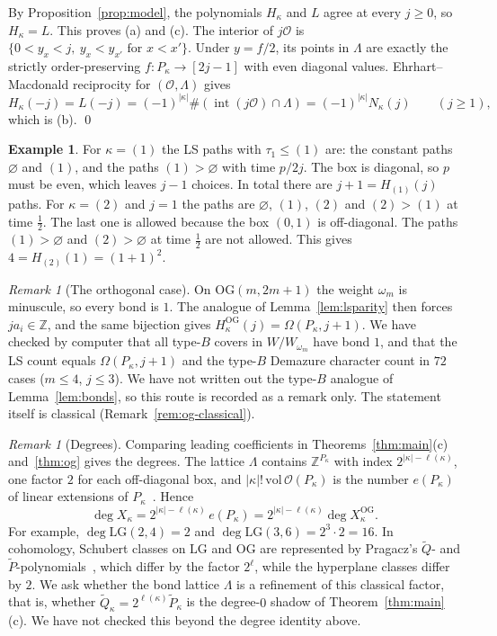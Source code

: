\documentclass[11pt]{amsart}
\theoremstyle{definition}
\newtheorem{example}[theorem]{Example}
\theoremstyle{remark}
\newtheorem{remark}[theorem]{Remark}
\newcommand{\LG}{\mathrm{LG}}
\newcommand{\OG}{\mathrm{OG}}
\newcommand{\Z}{\mathbb{Z}}
\newcommand{\Om}{\Omega}
\newcommand{\HOG}{H^{\OG}}
\newcommand{\ord}{\mathcal{O}}
\newcommand{\interior}{\operatorname{int}}
\begin{document}
By Proposition~\ref{prop:model}, the polynomials $H_\kappa$ and $L$ agree at every $j\ge0$, so
$H_\kappa=L$. This proves (a) and (c). The interior of $j\ord$ is
$\{0<y_x<j,\ y_x<y_{x'}\text{ for }x<x'\}$. Under $y=f/2$, its points in $\Lambda$ are exactly
the strictly order-preserving $f\colon P_\kappa\to[2j-1]$ with even diagonal values.
Ehrhart--Macdonald reciprocity for $(\ord,\Lambda)$ gives
\[ H_\kappa(-j)=L(-j)=(-1)^{|\kappa|}\#(\interior(j\ord)\cap\Lambda)=(-1)^{|\kappa|}N_\kappa(j)\qquad(j\ge1), \]
which is (b). \qed

\begin{example}\label{ex:ls-small}
For $\kappa=(1)$ the LS paths with $\tau_1\le(1)$ are: the constant paths $\varnothing$ and
$(1)$, and the paths $(1)>\varnothing$ with time $p/2j$. The box is diagonal, so $p$ must be
even, which leaves $j-1$ choices. In total there are $j+1=H_{(1)}(j)$ paths. For $\kappa=(2)$
and $j=1$ the paths are $\varnothing$, $(1)$, $(2)$ and $(2)>(1)$ at time $\tfrac12$. The last
one is allowed because the box $(0,1)$ is off-diagonal. The paths $(1)>\varnothing$ and
$(2)>\varnothing$ at time $\tfrac12$ are not allowed. This gives $4=H_{(2)}(1)=(1+1)^2$.
\end{example}

\begin{remark}[The orthogonal case]\label{rem:og-ls}
On $\OG(m,2m+1)$ the weight $\omega_m$ is minuscule, so every bond is $1$. The analogue of
Lemma~\ref{lem:lsparity} then forces $ja_i\in\Z$, and the same bijection gives
$\HOG_\kappa(j)=\Om(P_\kappa,j+1)$. We have checked by computer that all type-$B$ covers in
$W/W_{\omega_m}$ have bond $1$, and that the LS count equals $\Om(P_\kappa,j+1)$ and the
type-$B$ Demazure character count in $72$ cases ($m\le4$, $j\le3$). We have not written out
the type-$B$ analogue of Lemma~\ref{lem:bonds}, so this route is recorded as a remark only.
The statement itself is classical (Remark~\ref{rem:og-classical}).
\end{remark}

\begin{remark}[Degrees]\label{rem:degrees}
Comparing leading coefficients in Theorems~\ref{thm:main}(c) and~\ref{thm:og} gives the
degrees. The lattice $\Lambda$ contains $\Z^{P_\kappa}$ with index $2^{|\kappa|-\ell(\kappa)}$,
one factor $2$ for each off-diagonal box, and $|\kappa|!\,\mathrm{vol}\,\ord(P_\kappa)$ is the
number $e(P_\kappa)$ of linear extensions of $P_\kappa$~\cite{Sta86}. Hence
\[ \deg X_\kappa=2^{|\kappa|-\ell(\kappa)}\,e(P_\kappa)=2^{|\kappa|-\ell(\kappa)}\deg X^{\OG}_\kappa. \]
For example, $\deg\LG(2,4)=2$ and $\deg\LG(3,6)=2^3\cdot2=16$. In cohomology, Schubert classes on
$\LG$ and $\OG$ are represented by Pragacz's $\tilde Q$- and $\tilde P$-polynomials~\cite{Pra91}, which differ
by the factor $2^{\ell}$, while the hyperplane classes differ by $2$. We ask whether the bond
lattice $\Lambda$ is a refinement of this classical factor, that is, whether
$\tilde Q_\kappa=2^{\ell(\kappa)}\tilde P_\kappa$ is the degree-$0$ shadow of
Theorem~\ref{thm:main}(c). We have not checked this beyond the degree identity above.
\end{remark}
\end{document}
